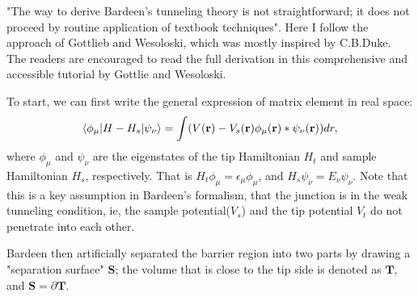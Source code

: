 "The way to derive Bardeen's tunneling theory is not straightforward; it does not proceed by routine application of textbook techniques"\cite{gottliebBardeensTunnelingTheory}. Here I follow the approach of Gottlieb and Wesoloski\cite{gottliebBardeensTunnelingTheory}, which was mostly inspired by C.B.Duke\cite{dukeTunnelingSolids1973}. The readers are encouraged to read the full derivation in this comprehensive and accessible tutorial by Gottlie and Wesoloski\cite{gottliebBardeensTunnelingTheory}. 

To start, we can first write the general expression of matrix element in real space: 
\begin{equation}
	\label{eq:bardeen_1}
	\braket{\phi_{\mu}|H-H_s|\psi_{\nu}} = \int(V(\mathbf{r})- V_s(\mathbf{r})\phi_{\mu}(\mathbf{r})*\psi_{\nu}(\mathbf{r}))dr,
\end{equation}
where $\phi_{\mu}$ and $\psi_{\nu}$ are the eigenstates of the tip Hamiltonian $H_t$ and sample Hamiltonian $H_s$, respectively. That is $H_t \phi_{\mu} = \epsilon_{\mu} \phi_{\mu}$, and $H_s \psi_{\nu} = E_{\nu} \psi_{\nu}$. Note that this is a key assumption in Bardeen's formalism, that the junction is in the weak tunneling condition, ie, the sample potential($V_s$) and the tip potential $V_t$ do not penetrate into each other. 

Bardeen then artificially separated the barrier region into two parts by drawing a "separation surface" $\mathbf{S}$; the volume that is close to the tip side is denoted as $\mathbf{T}$, and $\mathbf{S} = \partial \mathbf{T}$.

